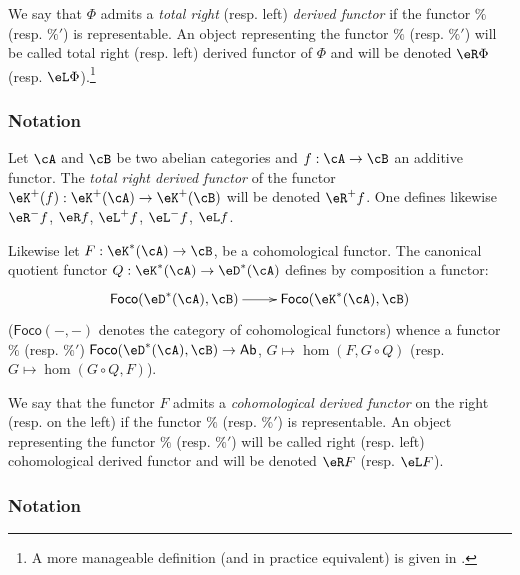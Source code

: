 \begin{definition}\label{VIII:4-1-2}
We say that $\Phi$ admits a \emph{total right} (resp.
left) \emph{derived functor} if the functor $\%$ (resp. $\%'$) is representable. An
object representing the functor $\%$ (resp. $\%'$) will be called total right
(resp. left) derived functor of $\Phi$ and will be denoted
$\eR \Phi$ (resp. $\eL \Phi$).\footnote{A more manageable definition (and in
practice equivalent) is given in \cite[XVII 1.2]{sga4}.}
\end{definition}





\subsubsection{Notation}\label{VIII:4-1-3}

Let $\cA$ and $\cB$ be two abelian categories and $f:\cA\to \cB$ an
additive functor. The \emph{total right derived functor} of the functor
$\eK^+(f):\eK^+(\cA) \to \eK^+(\cB)$ will be denoted $\eR^+ f$. One defines
likewise $\eR^- f$, $\eR f$, $\eL^+ f$, $\eL^- f$, $\eL f$.

Likewise let $F:\eK^\ast(\cA) \to \cB$, be a cohomological functor. The
canonical quotient functor $Q:\eK^\ast(\cA) \to \eD^\ast(\cA)$
defines by composition a functor: 
\[\xymatrix{
  \mathsf{Foco}(\eD^\ast(\cA),\cB) \ar[r] 
    & \mathsf{Foco}(\eK^\ast(\cA),\cB) 
}\]
($\mathsf{Foco}(-,-)$ denotes the category of cohomological functors)
whence a functor $\%$ (resp. $\%'$)
$\mathsf{Foco}(\eD^\ast(\cA),\cB) \to \mathsf{Ab}$, $G\mapsto \hom(F,G\circ Q)$
(resp. $G\mapsto \hom(G\circ Q,F)$). 





\begin{definition}\label{VIII:4-1-4}
We say that the functor $F$ admits a \emph{cohomological derived functor}
on the right (resp. on the left) if the functor $\%$ (resp. $\%'$) is
representable. An object representing the functor $\%$ (resp. $\%'$) will be
called right (resp. left) cohomological derived functor and
will be denoted $\eR F$ (resp. $\eL F$). 
\end{definition}





\subsubsection{Notation}\label{VIII:4-1-5}

